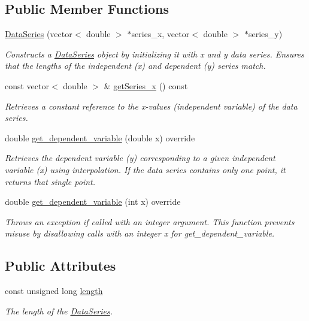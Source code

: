 \subsection*{Public Member Functions}
\begin{DoxyCompactItemize}
\item 
\mbox{\hyperlink{classDataSeries_a8af4ff388a574c8b836c2880492a8423}{Data\+Series}} (vector$<$ double $>$ $\ast$series\+\_\+x, vector$<$ double $>$ $\ast$series\+\_\+y)
\begin{DoxyCompactList}\small\item\em Constructs a {\ttfamily \mbox{\hyperlink{classDataSeries}{Data\+Series}}} object by initializing it with x and y data series. Ensures that the lengths of the independent ({\ttfamily x}) and dependent ({\ttfamily y}) series match. \end{DoxyCompactList}\item 
const vector$<$ double $>$ \& \mbox{\hyperlink{classDataSeries_a8bc2554fe0708acf648adc9546a005e1}{get\+Series\+\_\+x}} () const
\begin{DoxyCompactList}\small\item\em Retrieves a constant reference to the x-\/values (independent variable) of the data series. \end{DoxyCompactList}\item 
double \mbox{\hyperlink{classDataSeries_a3cb684ebcbdd6d9969996f306bed8b53}{get\+\_\+dependent\+\_\+variable}} (double x) override
\begin{DoxyCompactList}\small\item\em Retrieves the dependent variable ({\ttfamily y}) corresponding to a given independent variable ({\ttfamily x}) using interpolation. If the data series contains only one point, it returns that single point. \end{DoxyCompactList}\item 
double \mbox{\hyperlink{classDataSeries_a57c3737304a489a3ae9cae5910fc5337}{get\+\_\+dependent\+\_\+variable}} (int x) override
\begin{DoxyCompactList}\small\item\em Throws an exception if called with an integer argument. This function prevents misuse by disallowing calls with an integer {\ttfamily x} for {\ttfamily get\+\_\+dependent\+\_\+variable}. \end{DoxyCompactList}\end{DoxyCompactItemize}
\subsection*{Public Attributes}
\begin{DoxyCompactItemize}
\item 
const unsigned long \mbox{\hyperlink{classDataSeries_ad4a99b265519d2f57b787c03f2cf2f83}{length}}
\begin{DoxyCompactList}\small\item\em The length of the \mbox{\hyperlink{classDataSeries}{Data\+Series}}. \end{DoxyCompactList}\end{DoxyCompactItemize}


